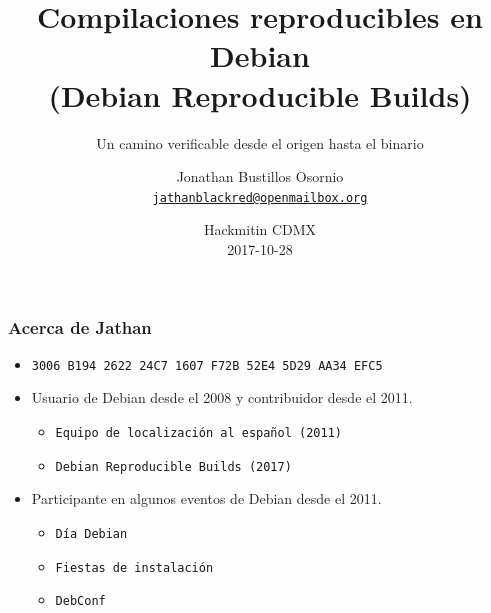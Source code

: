 \documentclass[14pt,aspectratio=169]{beamer}
\title[Reproducible Builds]{Compilaciones reproducibles en Debian\\
(Debian Reproducible Builds)}
\subtitle{Un camino verificable desde el origen hasta el binario}
\author[Jathan]{%
   \texorpdfstring{
            Jonathan Bustillos Osornio\\
            \href{mailto:jathanblackred@openmailbox.org}{\texttt{jathanblackred@openmailbox.org}}
   }{Jathan}}
\institute[Debian]{}
\date[Hackmitin CDMX 2017]{%
 Hackmitin CDMX\\
 \small
 2017-10-28}
\begin{document}
\begin{frame}
\titlepage
\end{frame}

\begin{frame}
 \frametitle{Acerca de Jathan}

 \begin{itemize}
  \item \small{\texttt{3006 B194 2622 24C7 1607 F72B 52E4 5D29 AA34 EFC5}}
  \item Usuario de Debian desde el 2008 y contribuidor desde el 2011.
    \begin{itemize}
    \item \texttt{Equipo de localización al español (2011)}
    \item \texttt{Debian Reproducible Builds (2017)}
   \end{itemize}   
  \item Participante en algunos eventos de Debian desde el 2011.
   \begin{itemize}
    \item \texttt{Día Debian}
    \item \texttt{Fiestas de instalación}
    \item \texttt{DebConf}
   \end{itemize}
 \end{itemize}
\end{frame}
\end{document}
